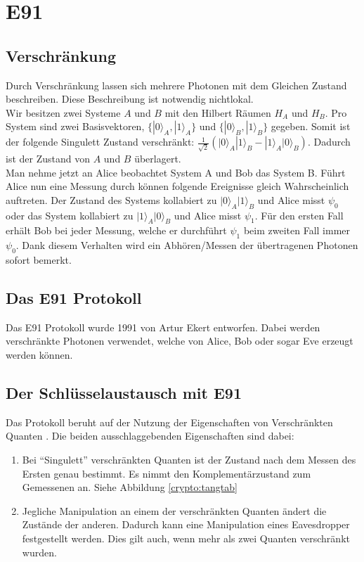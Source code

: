 \section{E91}
  \subsection{Verschr\"ankung}
  Durch Verschr\"ankung lassen sich mehrere Photonen mit dem Gleichen Zustand beschreiben. Diese Beschreibung ist notwendig nichtlokal.\\
  	Wir besitzen zwei Systeme $A$ und $B$ mit den Hilbert R\"aumen $H_A$ und $H_B$. Pro System sind zwei Basisvektoren,  $ \{|0\rangle_A,|1\rangle_A\}$ und $\{|0\rangle_B,|1\rangle_B\}$ gegeben. Somit ist der folgende Singulett Zustand verschr\"ankt: $\frac{1}{\sqrt{2}}(\lvert0\rangle_A|1\rangle_B - |1\rangle_A|0\rangle_B) $. Dadurch ist der Zustand von $A$ und $B$ \"uberlagert.\\
	Man nehme jetzt an Alice beobachtet System A und Bob das System B. F\"uhrt Alice nun eine Messung durch k\"onnen folgende Ereignisse gleich Wahrscheinlich auftreten. Der Zustand des Systems kollabiert zu $\lvert0\rangle_A|1\rangle_B$ und Alice misst $\psi_0$ oder das System kollabiert zu $\lvert1\rangle_A|0\rangle_B$ und Alice misst $\psi_1$. F\"ur den ersten Fall erh\"alt Bob bei jeder Messung, welche er durchf\"uhrt $\psi_1$ beim zweiten Fall immer $\psi_0$. Dank diesem Verhalten wird ein Abh\"oren/Messen der \"ubertragenen Photonen sofort bemerkt.
  \subsection{Das E91 Protokoll}
  Das E91 Protokoll wurde 1991 von Artur Ekert entworfen.
  Dabei werden verschr\"ankte Photonen verwendet, welche von Alice, Bob oder sogar Eve erzeugt werden k\"onnen.

  \subsection{Der Schl\"usselaustausch mit E91}
  Das Protokoll beruht auf der Nutzung der Eigenschaften von Verschr\"ankten Quanten \cite{qc:verschraenkung}.
  Die beiden ausschlaggebenden Eigenschaften sind dabei:

  \begin{enumerate}
      \item Bei ``Singulett'' verschr\"ankten Quanten ist der Zustand nach dem Messen des Ersten genau bestimmt.
        Es nimmt den Komplement\"arzustand zum Gemessenen an.
        Siehe Abbildung \ref{crypto:tangtab}
      \item Jegliche Manipulation an einem der verschr\"ankten Quanten \"andert die Zust\"ande der anderen.
        Dadurch kann eine Manipulation eines Eavesdropper festgestellt werden.
        Dies gilt auch, wenn mehr als zwei Quanten verschr\"ankt wurden.
  \end{enumerate}


